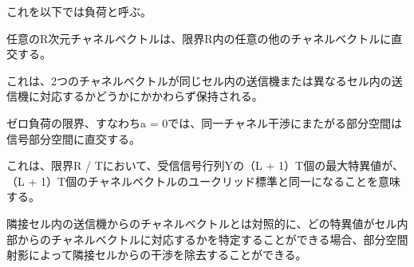 \documentclass[11pt]{jsarticle}
\begin{document}
これを以下では負荷と呼ぶ。

任意のR次元チャネルベクトルは、限界R内の任意の他のチャネルベクトルに直交する。

これは、2つのチャネルベクトルが同じセル内の送信機または異なるセル内の送信機に対応するかどうかにかかわらず保持される。

ゼロ負荷の限界、すなわちa = 0では、同一チャネル干渉にまたがる部分空間は信号部分空間に直交する。

これは、限界R / Tにおいて、受信信号行列Yの（L + 1）T個の最大特異値が、（L + 1）T個のチャネルベクトルのユークリッド標準と同一になることを意味する。

隣接セル内の送信機からのチャネルベクトルとは対照的に、どの特異値がセル内部からのチャネルベクトルに対応するかを特定することができる場合、部分空間射影によって隣接セルからの干渉を除去することができる。



\end{document}
